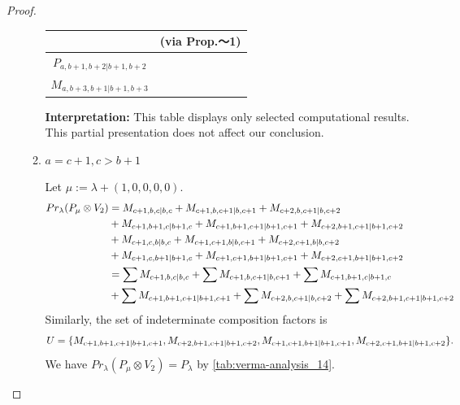 \begin{proof}
\begin{enumerate}
\begin{enumerate}
\begin{table}[htbp]
\begin{tabular}{cc}
     & \textbf{(via Prop.～1)}  \\
\midrule
 $P_{a,b+1,b+2|b+1,b+2}$ & \makecell{
 $M_{a,b+2,b+2|b+2,b+2}$,
 $M_{a,b+1,b+3|b+1,b+3}$,
 $M_{a,b+3,b+2|b+2,b+3}$,
 $M_{a,b+2,b+1|b+1,b+2}$, \\
 $M_{a,b+3,b+1|b+1,b+3}$
}\\
\bottomrule
\end{tabular}
\vspace{0.5em}
\parbox{\linewidth}{\small
\textbf{Interpretation:}
This table displays only selected computational results. This partial presentation does not affect our conclusion.
}
\end{table}
      \item $a=c+1, c>b+1$ \par
        Let $\mu:=\lambda + (1,0,0,0,0) $.
        \begin{equation}\notag
          \begin{aligned}
            Pr_{\lambda}(P_\mu \otimes V_{2}) &=
M_{c+1,b,c|b,c}
+ M_{c+1,b,c+1|b,c+1}
+ M_{c+2,b,c+1|b,c+2}\\
                                            &
+ M_{c+1,b+1,c|b+1,c}
+ M_{c+1,b+1,c+1|b+1,c+1}
+ M_{c+2,b+1,c+1|b+1,c+2}\\
                                            &
+ M_{c+1,c,b|b,c}
+ M_{c+1,c+1,b|b,c+1}
+ M_{c+2,c+1,b|b,c+2}\\
                                            &
+ M_{c+1,c,b+1|b+1,c}
+ M_{c+1,c+1,b+1|b+1,c+1}
+ M_{c+2,c+1,b+1|b+1,c+2} \\
                                               &=
\sum M_{c+1,b,c|b,c}
+ \sum M_{c+1,b,c+1|b,c+1}
+ \sum M_{c+1,b+1,c|b+1,c}\\
                                            &
+ \sum M_{c+1,b+1,c+1|b+1,c+1}
+ \sum M_{c+2,b,c+1|b,c+2}
+ \sum M_{c+2,b+1,c+1|b+1,c+2}
          \end{aligned}
        \end{equation}
      Similarly, the set of indeterminate composition factors is 
\begin{equation}\notag
  \begin{aligned}
    U = \{
M_{c+1,b+1,c+1|b+1,c+1},
M_{c+2,b+1,c+1|b+1,c+2},
M_{c+1,c+1,b+1|b+1,c+1},
M_{c+2,c+1,b+1|b+1,c+2}
\}.
  \end{aligned}
\end{equation}
       We have $Pr_{\lambda}(P_\mu \otimes V_{2}) = P_\lambda  $ by \cref{tab:verma-analysis_14}.
\begin{table}[htbp]
\centering

\end{table}
\end{enumerate}
\end{enumerate}
\end{proof}
